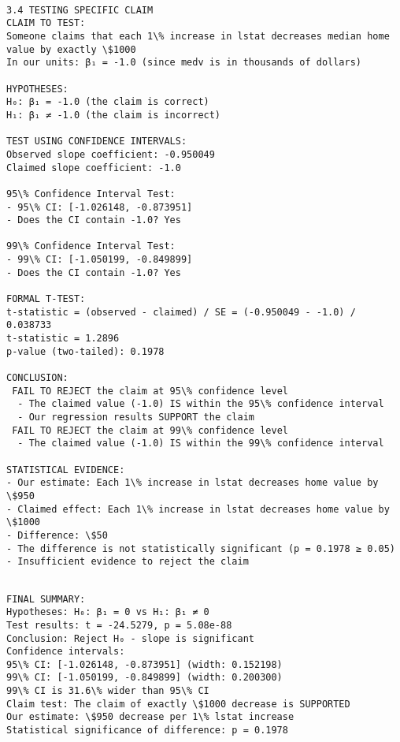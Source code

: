 \documentclass[8pt, twocolumn]{extarticle}
\begin{document}
    \begin{Verbatim}[commandchars=\\\{\}]

3.4 TESTING SPECIFIC CLAIM
CLAIM TO TEST:
Someone claims that each 1\% increase in lstat decreases median home value by exactly \$1000
In our units: β₁ = -1.0 (since medv is in thousands of dollars)

HYPOTHESES:
H₀: β₁ = -1.0 (the claim is correct)
H₁: β₁ ≠ -1.0 (the claim is incorrect)

TEST USING CONFIDENCE INTERVALS:
Observed slope coefficient: -0.950049
Claimed slope coefficient: -1.0

95\% Confidence Interval Test:
- 95\% CI: [-1.026148, -0.873951]
- Does the CI contain -1.0? Yes

99\% Confidence Interval Test:
- 99\% CI: [-1.050199, -0.849899]
- Does the CI contain -1.0? Yes

FORMAL T-TEST:
t-statistic = (observed - claimed) / SE = (-0.950049 - -1.0) / 0.038733
t-statistic = 1.2896
p-value (two-tailed): 0.1978

CONCLUSION:
 FAIL TO REJECT the claim at 95\% confidence level
  - The claimed value (-1.0) IS within the 95\% confidence interval
  - Our regression results SUPPORT the claim
 FAIL TO REJECT the claim at 99\% confidence level
  - The claimed value (-1.0) IS within the 99\% confidence interval

STATISTICAL EVIDENCE:
- Our estimate: Each 1\% increase in lstat decreases home value by \$950
- Claimed effect: Each 1\% increase in lstat decreases home value by \$1000
- Difference: \$50
- The difference is not statistically significant (p = 0.1978 ≥ 0.05)
- Insufficient evidence to reject the claim
    \end{Verbatim}
    
    \centering
    \begin{Verbatim}[commandchars=\\\{\}]

FINAL SUMMARY:
Hypotheses: H₀: β₁ = 0 vs H₁: β₁ ≠ 0
Test results: t = -24.5279, p = 5.08e-88
Conclusion: Reject H₀ - slope is significant
Confidence intervals:
95\% CI: [-1.026148, -0.873951] (width: 0.152198)
99\% CI: [-1.050199, -0.849899] (width: 0.200300)
99\% CI is 31.6\% wider than 95\% CI
Claim test: The claim of exactly \$1000 decrease is SUPPORTED
Our estimate: \$950 decrease per 1\% lstat increase
Statistical significance of difference: p = 0.1978
    \end{Verbatim}
\end{document}
